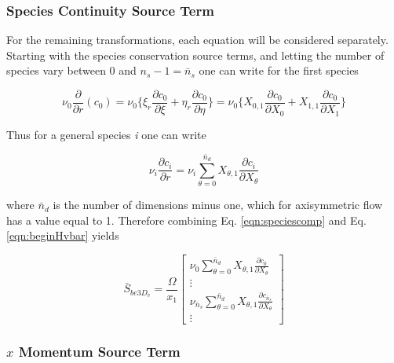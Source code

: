 \subsubsection{Species Continuity Source Term}

	For the remaining transformations, each equation will be considered separately.  Starting with the
species conservation source terms, and letting the number of species vary between 0 and $n_s -1 = \bar{n}_s$
one can write for the first species

\begin{displaymath}
	\nu_0 \frac{\partial}{\partial r}(c_0) = \nu_0 \Big\{\xi_r \frac{\partial c_0}{\partial \xi}
	+ \eta_r \frac{\partial c_0}{\partial \eta}\Big\} = \nu_0 \Big\{X_{0,1} \frac{\partial c_0}{\partial X_0}
	+ X_{1,1} \frac{\partial c_0}{\partial X_1} \Big\}
\end{displaymath}

	Thus for a general species \emph{i} one can write

\begin{equation}
	\nu_i \frac{\partial c_i}{\partial r} = \nu_i \sum_{\theta = 0}^{\bar{n}_d}X_{\theta,1} 
	\frac{\partial c_i}{\partial X_\theta}
\label{eqn:speciescomp}
\end{equation}

	where $\bar{n}_d$ is the number of dimensions minus one, which for axisymmetric flow has a value equal
to 1.  Therefore combining Eq. \ref{eqn:speciescomp} and Eq. \ref{eqn:beginHvbar} yields

\begin{displaymath}
	\bar{S}_{be3D_v} = \frac{\Omega}{x_1}\left[ \begin{array}{c}
		\nu_0 \sum_{\theta = 0}^{\bar{n}_d}X_{\theta,1} 
		\frac{\partial c_0}{\partial X_\theta} \\
		\vdots \\
		\nu_{\bar{n}_s} \sum_{\theta = 0}^{\bar{n}_d}X_{\theta,1} 
		\frac{\partial c_{\bar{n}_s}}{\partial X_\theta} \\
		\vdots
		   \end{array}
	    \right]
\end{displaymath}

\subsubsection{$x$ Momentum Source Term}

